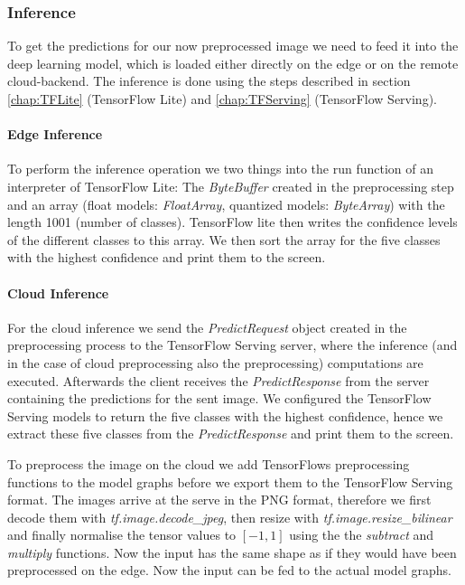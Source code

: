 \subsubsection{Inference}
To get the predictions for our now preprocessed image we need to feed it into the deep learning model, which is loaded either directly on the edge or on the remote cloud-backend. 
The inference is done using the steps described in section \ref{chap:TFLite} (TensorFlow Lite) and \ref{chap:TFServing} (TensorFlow Serving).
\paragraph{Edge Inference}
To perform the inference operation we two things into the run function of an interpreter of TensorFlow Lite: The \emph{ByteBuffer} created in the preprocessing step and an array (float models: \emph{FloatArray}, quantized models: \emph{ByteArray}) with the length 1001 (number of classes). TensorFlow lite then writes the confidence levels of the different classes to this array. We then sort the array for the five classes with the highest confidence and print them to the screen.

\paragraph{Cloud Inference}

For the cloud inference we send the \emph{PredictRequest} object created in the preprocessing process to the TensorFlow Serving server, where the inference (and in the case of cloud preprocessing also the preprocessing) computations are executed. Afterwards the client receives the \emph{PredictResponse} from the server containing the predictions for the sent image. We configured the TensorFlow Serving models to return the five classes with the highest confidence, hence we extract these five classes from the \emph{PredictResponse} and print them to the screen.

To preprocess the image on the cloud we add TensorFlows preprocessing functions to the model graphs before we export them to the TensorFlow Serving format. The images arrive at the serve in the PNG format, therefore we first decode them with \emph{tf.image.decode\_jpeg}, then resize with \emph{tf.image.resize\_bilinear} and finally normalise the tensor values to $[-1,1]$ using the the \emph{subtract} and \emph{multiply} functions. Now the input has the same shape as if they would have been preprocessed on the edge. Now the input can be fed to the actual model graphs.

